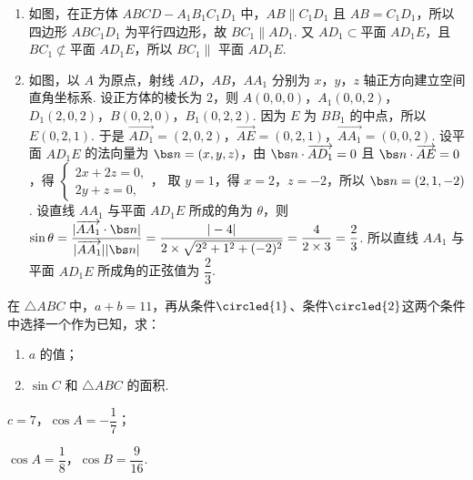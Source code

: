 \begin{solution}
\begin{enumerate}
    \item 如图，在正方体 \(ABCD-A_1B_1C_1D_1\) 中，\(AB\parallel C_1D_1\) 且 \(AB=C_1D_1\)，所以四边形 \(ABC_1D_1\) 为平行四边形，故 \(BC_1\parallel AD_1\). 又 \(AD_1\subset\text{平面 }AD_1E\)，且 \(BC_1\not\subset\text{平面 }AD_1E\)，所以 \(BC_1\parallel\) 平面 \(AD_1E\).
    \item 如图，以 \(A\) 为原点，射线 \(AD\)，\(AB\)，\(AA_1\) 分别为 \(x\)，\(y\)，\(z\) 轴正方向建立空间直角坐标系. 设正方体的棱长为 \(2\)，则 \(A(0,0,0)\)，\(A_1(0,0,2)\)，\(D_1(2,0,2)\)，\(B(0,2,0)\)，\(B_1(0,2,2)\). 因为 \(E\) 为 \(BB_1\) 的中点，所以 \(E(0,2,1)\). 于是 \(\overrightarrow{AD_1}=(2,0,2)\)，\(\overrightarrow{AE}=(0,2,1)\)，\(\overrightarrow{AA_1}=(0,0,2)\). 设平面 \(AD_1E\) 的法向量为 \(\bs n=(x,y,z)\)，由 \(\bs n\cdot\overrightarrow{AD_1}=0\) 且 \(\bs n\cdot\overrightarrow{AE}=0\)，得
    \(\begin{cases}
    2x+2z=0,\\
    2y+z=0,
    \end{cases}\)，
    取 \(y=1\)，得 \(x=2\)，\(z=-2\)，所以 \(\bs n=(2,1,-2)\). 设直线 \(AA_1\) 与平面 \(AD_1E\) 所成的角为 \(\theta\)，则 \(\sin\theta=\dfrac{|\overrightarrow{AA_1}\cdot\bs n|}{|\overrightarrow{AA_1}||\bs n|}=\dfrac{|-4|}{2\times\sqrt{2^2+1^2+(-2)^2}}=\dfrac{4}{2\times3}=\dfrac23\). 所以直线 \(AA_1\) 与平面 \(AD_1E\) 所成角的正弦值为 \(\dfrac23\).
\end{enumerate}
\end{solution}

\begin{problem}
在 \(\triangle ABC\) 中，\(a+b=11\)，再从条件\(\circled{1}\)、条件\(\circled{2}\)这两个条件中选择一个作为已知，求：

\begin{enumerate}
    \item \(a\) 的值；
    \item \(\sin C\) 和 \(\triangle ABC\) 的面积.
\end{enumerate}

\begin{circlelist}
\item \(c=7\)，\(\cos A=-\dfrac17\)；

\item \(\cos A=\dfrac18\)，\(\cos B=\dfrac{9}{16}\).
\end{circlelist}
\end{problem}

